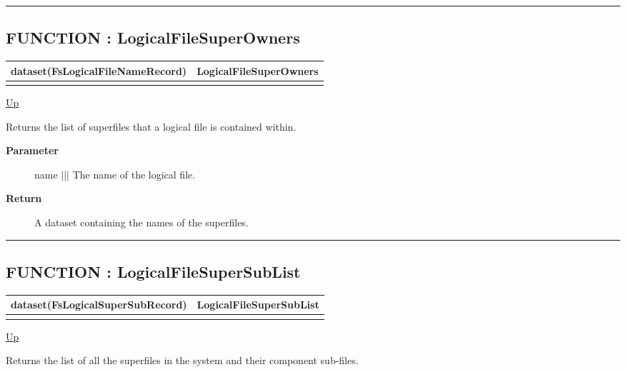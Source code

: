 \rule{\textwidth}{0.4pt}
\subsection*{FUNCTION : LogicalFileSuperOwners}
\hypertarget{ecldoc:file.logicalfilesuperowners}{}

{\renewcommand{\arraystretch}{1.5}
\begin{tabularx}{\textwidth}{|>{\raggedright\arraybackslash}l|X|}
\hline
\hspace{0pt}dataset(FsLogicalFileNameRecord) & LogicalFileSuperOwners \\
\hline
\multicolumn{2}{|>{\raggedright\arraybackslash}X|}{\hspace{0pt}(varstring name)} \\
\hline
\end{tabularx}
}

\hyperlink{ecldoc:File}{Up}

\par
Returns the list of superfiles that a logical file is contained within.

\par
\begin{description}
\item [\textbf{Parameter}] name ||| The name of the logical file.
\item [\textbf{Return}] A dataset containing the names of the superfiles.
\end{description}

\rule{\textwidth}{0.4pt}
\subsection*{FUNCTION : LogicalFileSuperSubList}
\hypertarget{ecldoc:file.logicalfilesupersublist}{}

{\renewcommand{\arraystretch}{1.5}
\begin{tabularx}{\textwidth}{|>{\raggedright\arraybackslash}l|X|}
\hline
\hspace{0pt}dataset(FsLogicalSuperSubRecord) & LogicalFileSuperSubList \\
\hline
\multicolumn{2}{|>{\raggedright\arraybackslash}X|}{\hspace{0pt}()} \\
\hline
\end{tabularx}
}

\hyperlink{ecldoc:File}{Up}

\par
Returns the list of all the superfiles in the system and their component sub-files.

